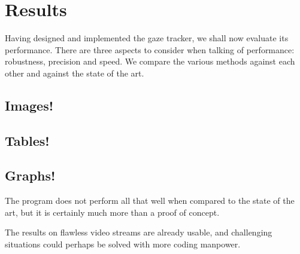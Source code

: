 \chapter{Results}

Having designed and implemented the gaze tracker, we shall now evaluate its performance.
There are three aspects to consider when talking of performance: robustness, precision and speed.
We compare the various methods against each other and against the state of the art.

\section{Images!}
\todo{\dots}
\section{Tables!}
\todo{\dots}
\section{Graphs!}
\todo{\dots}

The program does not perform all that well when compared to the state of the art, but it is certainly much more than a proof of concept.

The results on flawless video streams are already usable, and challenging situations could perhaps be solved with more coding manpower.
\todo{\dots}
